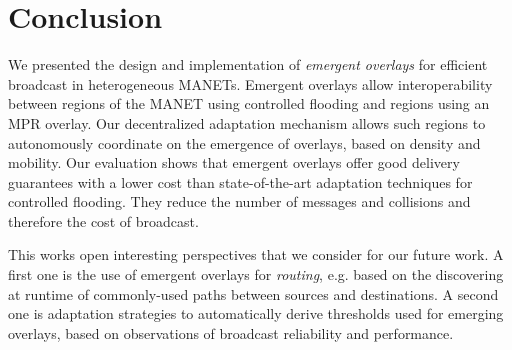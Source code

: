 
\section{Conclusion}
\label{sec:conclusion}

We presented the design and implementation of \emph{emergent overlays} for efficient broadcast in heterogeneous MANETs.
Emergent overlays allow interoperability between regions of the MANET using controlled flooding and regions using an MPR overlay.
Our decentralized adaptation mechanism allows such regions to autonomously coordinate on the emergence of  overlays, based on density and mobility.
Our evaluation shows that emergent overlays offer good delivery guarantees with a lower cost than state-of-the-art adaptation techniques for controlled flooding.
They reduce the number of messages and collisions and therefore the cost of broadcast.

This works open interesting perspectives that we consider for our future work.
A first one is the use of emergent overlays for \emph{routing}, e.g. based on the discovering at runtime of commonly-used paths between sources and destinations.
A second one is adaptation strategies to automatically derive thresholds used for emerging overlays, based on observations of broadcast reliability and performance.
